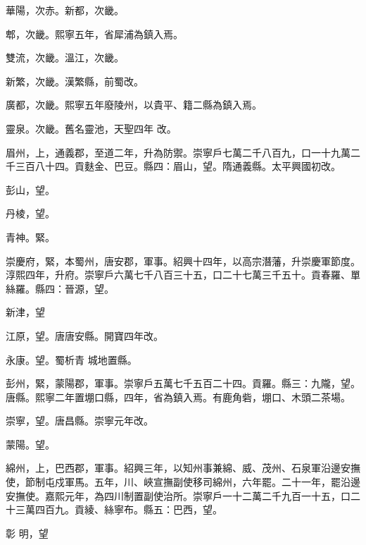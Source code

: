 \begin{pinyinscope}
 華陽，次赤。新都，次畿。



 郫，次畿。熙寧五年，省犀浦為鎮入焉。



 雙流，次畿。溫江，次畿。



 新繁，次畿。漢繁縣，前蜀改。



 廣都，次畿。熙寧五年廢陵州，以貴平、籍二縣為鎮入焉。



 靈泉。次畿。舊名靈池，天聖四年
 改。



 眉州，上，通義郡，至道二年，升為防禦。崇寧戶七萬二千八百九，口一十九萬二千三百八十四。貢麩金、巴豆。縣四：眉山，望。隋通義縣。太平興國初改。



 彭山，望。



 丹棱，望。



 青神。緊。



 崇慶府，緊，本蜀州，唐安郡，軍事。紹興十四年，以高宗潛藩，升崇慶軍節度。淳熙四年，升府。崇寧戶六萬七千八百三十五，口二十七萬三千五十。貢春羅、單絲羅。縣四：晉源，望。



 新津，望



 江原，望。唐唐安縣。開寶四年改。



 永康。望。蜀析青
 城地置縣。



 彭州，緊，蒙陽郡，軍事。崇寧戶五萬七千五百二十四。貢羅。縣三：九隴，望。唐縣。熙寧二年置堋口縣，四年，省為鎮入焉。有鹿角砦，堋口、木頭二茶場。



 崇寧，望。唐昌縣。崇寧元年改。



 蒙陽。望。



 綿州，上，巴西郡，軍事。紹興三年，以知州事兼綿、威、茂州、石泉軍沿邊安撫使，節制屯戍軍馬。五年，川、峽宣撫副使移司綿州，六年罷。二十一年，罷沿邊安撫使。嘉熙元年，為四川制置副使治所。崇寧戶一十二萬二千九百一十五，口二十三萬四百九。貢綾、絲寧布。縣五：巴西，望。



 彰
 明，望




\end{pinyinscope}

